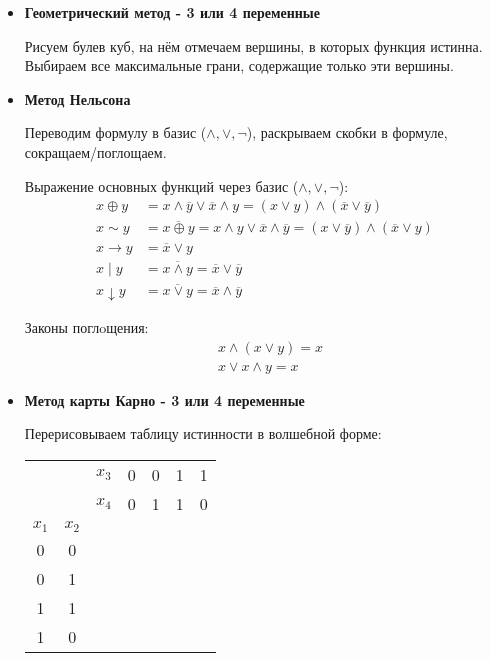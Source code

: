 \documentclass[final]{report}
\theoremstyle {remark}
\theoremstyle {remark}
\begin{document}
\begin{itemize}
\item {\bfseries Геометрический метод - 3 или 4 переменные}

Рисуем булев куб, на нём отмечаем вершины, в которых функция истинна.
Выбираем все максимальные грани, содержащие только эти вершины.

\item {\bfseries Метод Нельсона}

Переводим формулу в базис ($ \land, \lor, \neg $), раскрываем скобки в
формуле, сокращаем/поглощаем.

\begin{multicols}{2}
\begin{center}
Выражение основных функций через базис ($ \land, \lor, \neg $):
\begin{align*}
	x \oplus y & = x \land \overline{y} \lor \overline{x} \land y
	             = (x \lor y) \land (\overline{x} \lor \overline{y})
	                \\
	x \sim y & = \overline{x \oplus y}
	           = x \land y \lor \overline{x} \land \overline{y}
	           = (x \lor \overline{y}) \land (\overline{x} \lor y)
	                \\
	x \rightarrow y & = \overline{x} \lor y
	                \\
	x \mid y & = \overline{x \land y}
	          = \overline{x} \lor \overline{y}
	                \\
	x \downarrow y & = \overline{x \lor y}
	                 = \overline{x} \land \overline{y}
\end{align*}

Законы поглoщения:
\begin{align*}
	& x \land (x \lor y) = x \\
	& x \lor x \land y = x
\end{align*}
\end{center}
\end{multicols}

\item {\bfseries Метод карты Карно - 3 или 4 переменные}

Перерисовываем таблицу истинности в волшебной форме:


\begin{tabular}{c c c | c c c c}
    &     & $ x_3 $ & 0 & 0 & 1 & 1 \\
    &     & $ x_4 $ & 0 & 1 & 1 & 0 \\
$ x_1 $ & $ x_2 $ &     &   &   &   &   \\ \hline
0   & 0   &           &     &   &   &   \\
0   & 1   &           &     &   &   &   \\
1   & 1   &           &     &   &   &   \\
1   & 0   &           &     &   &   &
\end{tabular}



\end{itemize}
\end{document}
